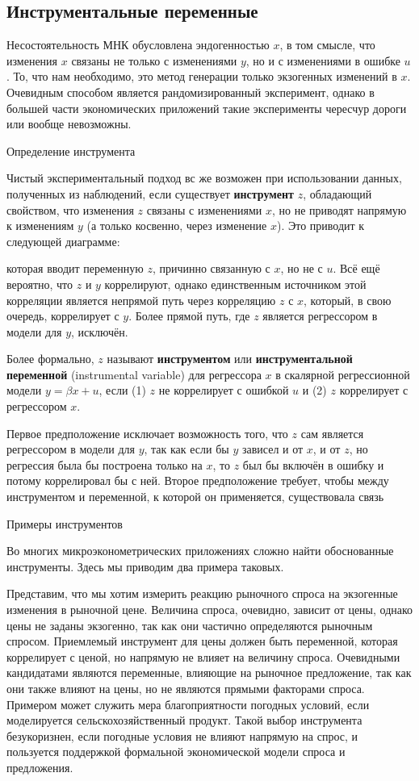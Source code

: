 \subsection{Инструментальные переменные}

Несостоятельность МНК обусловлена эндогенностью $x$, в том смысле, что изменения $x$ связаны не только с изменениями $y$, но и с изменениями в ошибке $u$. То, что нам необходимо, это метод генерации только экзогенных изменений в $x$. Очевидным способом является рандомизированный эксперимент, однако в большей части экономических приложений такие эксперименты чересчур дороги или вообще невозможны.
\begin{center}
Определение инструмента
\end{center}
Чистый экспериментальный подход вс же возможен при использовании данных, полученных из наблюдений, если существует \textbf{инструмент} $z$, обладающий свойством, что изменения $z$ связаны с изменениями $x$, но не приводят напрямую к изменениям $y$ (а только косвенно, через изменение $x$). Это приводит к следующей диаграмме:
\begin{figure}
\end{figure}
которая вводит переменную $z$, причинно связанную с $x$, но не с $u$. Всё ещё вероятно, что $z$ и $y$  коррелируют, однако единственным источником этой корреляции является непрямой путь через корреляцию $z$ с $x$, который, в свою очередь, коррелирует с $y$. Более прямой путь, где $z$ является регрессором в модели для $y$, исключён.

Более формально, $z$ называют \textbf{инструментом} или \textbf{инструментальной переменной}  (instrumental variable) для регрессора $x$ в скалярной регрессионной модели $y = \beta x +u $, если (1) $z$ не коррелирует с ошибкой $u$ и (2) $z$ коррелирует с регрессором $x$.

Первое предположение исключает возможность того, что $z$ сам является регрессором в модели для $y$, так как если бы $y$ зависел и от $x$, и от $z$, но регрессия была бы построена только на $x$, то $z$ был бы включён в ошибку и потому коррелировал бы с ней.  Второе предположение требует, чтобы между инструментом и переменной, к которой он применяется, существовала связь
\begin{center}
Примеры инструментов
\end{center}
Во многих микроэконометрических приложениях сложно найти обоснованные инструменты. Здесь мы приводим два примера таковых.

Представим, что мы хотим измерить реакцию рыночного спроса на экзогенные изменения в рыночной цене. Величина спроса, очевидно, зависит от цены, однако цены не заданы экзогенно, так как они частично определяются рыночным спросом. Приемлемый инструмент для цены должен быть переменной, которая коррелирует с ценой, но напрямую не влияет на величину спроса. Очевидными кандидатами являются переменные, влияющие на рыночное предложение, так как они также влияют на цены, но не являются прямыми факторами спроса. Примером может служить мера благоприятности погодных условий, если моделируется сельскохозяйственный продукт. Такой выбор инструмента безукоризнен, если погодные условия не влияют напрямую на спрос, и пользуется поддержкой формальной экономической модели спроса и предложения.


